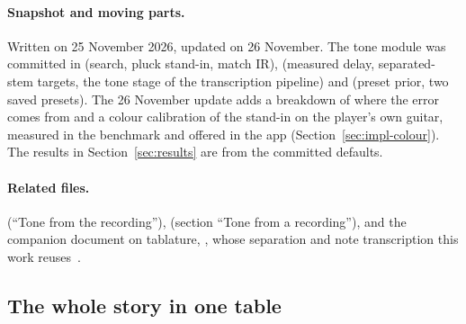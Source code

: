 \paragraph{Snapshot and moving parts.} Written on 25 November 2026, updated on
26 November. The tone module was committed in  (search, pluck
stand-in, match IR),  (measured delay, separated-stem targets, the
tone stage of the transcription pipeline) and  (preset prior, two
saved presets). The 26 November update adds a breakdown of where the error comes
from and a colour calibration of the stand-in on the player's own guitar,
measured in the benchmark and offered in the app (Section~\ref{sec:impl-colour}). The results in
Section~\ref{sec:results} are from the committed defaults.

\paragraph{Related files.}  (``Tone from the recording''),
 (section ``Tone from a recording''), and the companion
document on tablature, , whose
separation and note transcription this work reuses~\cite{deangelo2026tabreview}.

\subsection*{The whole story in one table}


